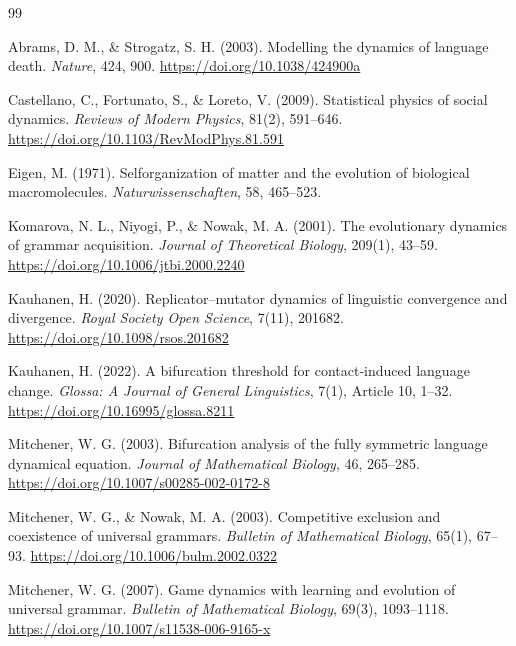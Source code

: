 \documentclass[11pt]{article}
\begin{document}
\begin{thebibliography}{99}

Abrams, D. M., \& Strogatz, S. H. (2003). Modelling the dynamics of language death. \textit{Nature}, 424, 900. \url{https://doi.org/10.1038/424900a}

Castellano, C., Fortunato, S., \& Loreto, V. (2009). Statistical physics of social dynamics. \textit{Reviews of Modern Physics}, 81(2), 591--646. \url{https://doi.org/10.1103/RevModPhys.81.591}

Eigen, M. (1971). Selforganization of matter and the evolution of biological macromolecules. \textit{Naturwissenschaften}, 58, 465--523.

Komarova, N. L., Niyogi, P., \& Nowak, M. A. (2001). The evolutionary dynamics of grammar acquisition. \textit{Journal of Theoretical Biology}, 209(1), 43--59. \url{https://doi.org/10.1006/jtbi.2000.2240}

Kauhanen, H. (2020). Replicator--mutator dynamics of linguistic convergence and divergence. \textit{Royal Society Open Science}, 7(11), 201682. \url{https://doi.org/10.1098/rsos.201682}

Kauhanen, H. (2022). A bifurcation threshold for contact-induced language change. \textit{Glossa: A Journal of General Linguistics}, 7(1), Article 10, 1--32. \url{https://doi.org/10.16995/glossa.8211}

Mitchener, W. G. (2003). Bifurcation analysis of the fully symmetric language dynamical equation. \textit{Journal of Mathematical Biology}, 46, 265--285. \url{https://doi.org/10.1007/s00285-002-0172-8}

Mitchener, W. G., \& Nowak, M. A. (2003). Competitive exclusion and coexistence of universal grammars. \textit{Bulletin of Mathematical Biology}, 65(1), 67--93. \url{https://doi.org/10.1006/bulm.2002.0322}

Mitchener, W. G. (2007). Game dynamics with learning and evolution of universal grammar. \textit{Bulletin of Mathematical Biology}, 69(3), 1093--1118. \url{https://doi.org/10.1007/s11538-006-9165-x}


\end{thebibliography}
\end{document}
